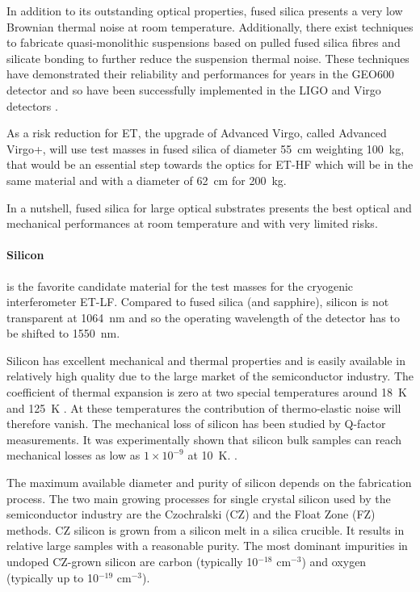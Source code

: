 In addition to its outstanding optical properties, fused silica presents a very low Brownian thermal noise at room temperature. Additionally, there exist techniques to fabricate quasi-monolithic suspensions based on pulled fused silica fibres and silicate bonding to further reduce the suspension thermal noise. These techniques have demonstrated their reliability and performances for years in the GEO600 detector \cite{plissi1998aspects} and so have been successfully implemented in the LIGO and Virgo detectors \cite{robertson2002quadruple,lorenzini2010monolithic}.

As a risk reduction for ET, the upgrade of Advanced Virgo, called Advanced Virgo+, will use test masses in fused silica of diameter 55~cm weighting 100~kg, that would be an essential step towards the optics for ET-HF which will be in the same material and with a diameter of 62~cm for 200~kg. 

In a nutshell, fused silica for large optical substrates presents the best optical and mechanical performances at room temperature and with very limited risks.\\


\paragraph{Silicon} is the favorite candidate material for the test masses for the cryogenic interferometer ET-LF. Compared to fused silica (and sapphire), silicon is not transparent at 1064~nm and so the operating wavelength of the detector has to be shifted to 1550~nm. 

Silicon has excellent mechanical and thermal properties and is easily available in relatively high quality due to the large market of the semiconductor industry. The coefficient of thermal expansion is zero at two special temperatures around 18~K and 125~K \cite{lyon1977siliconexpansion}. At these temperatures the contribution of thermo-elastic noise will therefore vanish. The mechanical loss of silicon has been studied by Q-factor measurements. It was experimentally shown that silicon bulk samples can reach mechanical losses as low as $1 \times 10^{-9}$ at 10~K. \cite{mcguigan1978siliconQ}.

The maximum available diameter and purity of silicon depends on the fabrication process. The two main growing processes for single crystal silicon used by the semiconductor industry are the Czochralski (CZ) and the Float Zone (FZ) methods. CZ silicon is grown from a silicon melt in a silica crucible. It results in relative large samples with a reasonable purity. The most dominant impurities in undoped CZ-grown silicon are carbon (typically 10$^{-18}$ cm$^{-3}$) and oxygen (typically up to 10$^{-19}$ cm$^{-3}$). 

